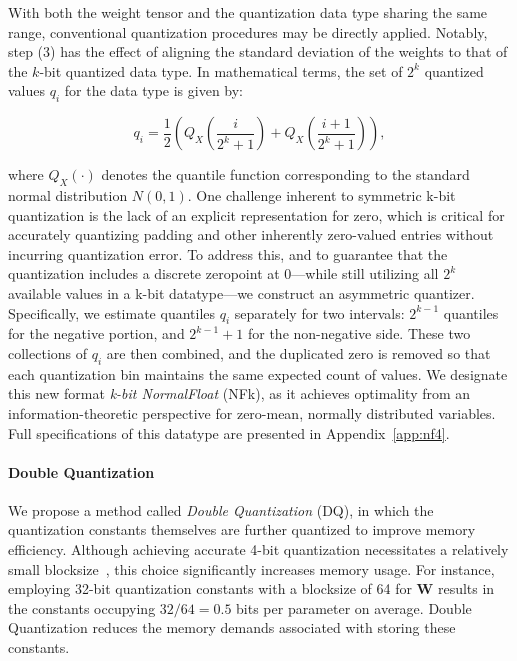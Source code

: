 With both the weight tensor and the quantization data type sharing the same range, conventional quantization procedures may be directly applied. Notably, step (3) has the effect of aligning the standard deviation of the weights to that of the $k$-bit quantized data type. In mathematical terms, the set of $2^k$ quantized values $q_i$ for the data type is given by:

\begin{equation}
q_i  = \frac{1}{2}\left( Q_X\left(\frac{i}{2^k+1}\right) + Q_X\left(\frac{i+1}{2^k+1}\right)\right),
\end{equation}

where $Q_X(\cdot)$ denotes the quantile function corresponding to the standard normal distribution $N(0,1)$. One challenge inherent to symmetric k-bit quantization is the lack of an explicit representation for zero, which is critical for accurately quantizing padding and other inherently zero-valued entries without incurring quantization error. To address this, and to guarantee that the quantization includes a discrete zeropoint at $0$—while still utilizing all $2^k$ available values in a k-bit datatype—we construct an asymmetric quantizer. Specifically, we estimate quantiles $q_i$ separately for two intervals: $2^{k-1}$ quantiles for the negative portion, and $2^{k-1} + 1$ for the non-negative side. These two collections of $q_i$ are then combined, and the duplicated zero is removed so that each quantization bin maintains the same expected count of values. We designate this new format \emph{k-bit NormalFloat} (NFk), as it achieves optimality from an information-theoretic perspective for zero-mean, normally distributed variables. Full specifications of this datatype are presented in Appendix~\ref{app:nf4}.

\paragraph{Double Quantization{}}
We propose a method called \emph{Double Quantization} (DQ), in which the quantization constants themselves are further quantized to improve memory efficiency. Although achieving accurate 4-bit quantization necessitates a relatively small blocksize~\citep{dettmers2022case}, this choice significantly increases memory usage. For instance, employing 32-bit quantization constants with a blocksize of 64 for $\mathbf{W}$ results in the constants occupying $32/64 = 0.5$ bits per parameter on average. Double Quantization reduces the memory demands associated with storing these constants.

